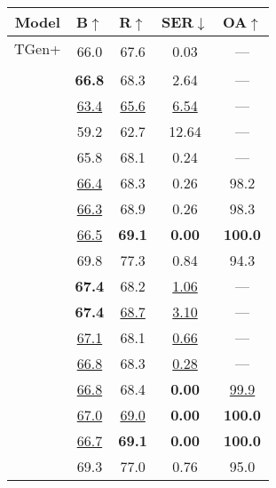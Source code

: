 \begin{table}[t!]
    \centering
    \begin{tabular}{ll cccc}
    \toprule
    \multicolumn{2}{c}{Model}&B$\uparrow$&R$\uparrow$&SER$\downarrow$&OA$\uparrow$    \\
    \midrule
    \multicolumn{2}{c}{TGen+} & \multirow{2}{*}{66.0} & \multirow{2}{*}{67.6} &
    \multirow{2}{*}{0.03} & \multirow{2}{*}{---}\\
    \multicolumn{2}{c}{\footnotesize \cite{dusek2019}} & \\
    \midrule
    \parbox[t]{2mm}{}
     &   & \textbf{66.8} & 68.3 & 2.64 & --- \\
     &   & \uline{63.4} & \uline{65.6} & \uline{6.54} & --- \\
     &   & 59.2 & 62.7 & 12.64 & --- \\
     &   & 65.8 & 68.1 & 0.24 & --- \\
     &   & \uline{66.4} & 68.3 & 0.26 & 98.2 \\
     &   & \uline{66.3} & 68.9 & 0.26 & 98.3 \\
     &   & \uline{66.5} & \textbf{69.1} & \textbf{0.00} & \textbf{100.0} \\
     &   & 69.8 & 77.3 & 0.84 & 94.3 \\
    \midrule
    \parbox[t]{2mm}{}
     &   & \textbf{67.4} & 68.2 & \uline{1.06} & --- \\
     &   & \textbf{67.4} & \uline{68.7} & \uline{3.10} & --- \\
     &   & \uline{67.1} & 68.1 & \uline{0.66} & --- \\
     &   & \uline{66.8} & 68.3 & \uline{0.28} & --- \\
     &   & \uline{66.8} & 68.4 & \textbf{0.00} & \uline{99.9} \\
     &   & \uline{67.0} & \uline{69.0} & \textbf{0.00} & \textbf{100.0} \\
     &   & \uline{66.7} & \textbf{69.1} & \textbf{0.00} & \textbf{100.0} \\
     &   & 69.3 & 77.0 & 0.76 & 95.0 \\
    \midrule

\end{tabular}
\end{table}

